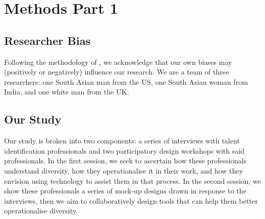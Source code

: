 





\section{Methods Part 1}
\subsection{Researcher Bias}
Following the methodology of \textcite{braun_using_2006}, we acknowledge that our own biases may (positively or negatively) influence our research. We are a team of three researchers: one South Asian man from the US, one South Asian woman from India, and one white man from the UK.

\subsection{Our Study}
Our study is broken into two components: a series of interviews with talent identification professionals and two participatory design workshops with said professionals. In the first session, we seek to ascertain how these professionals understand diversity, how they operationalise it in their work, and how they envision using technology to assist them in that process. In the second session, we show these professionals a series of mock-up designs drawn in response to the interviews, then we aim to collaboratively design tools that can help them better operationalise diversity.

